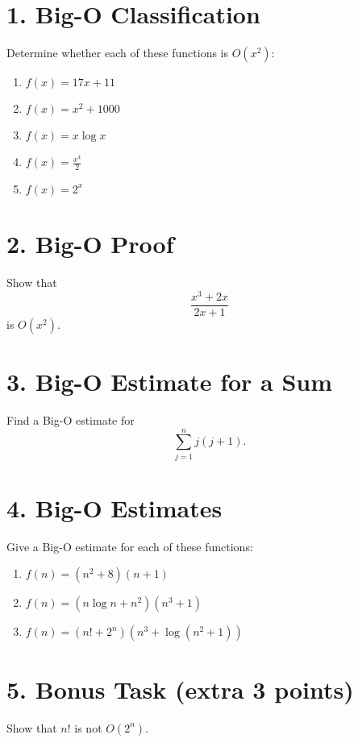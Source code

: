 \documentclass[a4paper,10pt]{article}
\begin{document}
\section*{1. Big-O Classification}

Determine whether each of these functions is \( O(x^2) \):

\begin{enumerate}[label=\arabic*)]
    \item \( f(x) = 17x + 11 \)
    \item \( f(x) = x^2 + 1000 \)
    \item \( f(x) = x \log x \)
    \item \( f(x) = \frac{x^4}{2} \)
    \item \( f(x) = 2^x \)
\end{enumerate}

\newpage

\section*{2. Big-O Proof}

Show that
\[
\frac{x^3 + 2x}{2x + 1}
\]
is \( O(x^2) \).

\newpage

\section*{3. Big-O Estimate for a Sum}

Find a Big-O estimate for
\[
\sum_{j=1}^{n} j(j + 1).
\]

\newpage

\section*{4. Big-O Estimates}

Give a Big-O estimate for each of these functions:

\begin{enumerate}[label=\arabic*)]
    \item \( f(n) = (n^2 + 8)(n + 1) \)
    \item \( f(n) = (n \log n + n^2)(n^3 + 1) \)
    \item \( f(n) = (n! + 2^n)(n^3 + \log(n^2 + 1)) \)
\end{enumerate}

\newpage

\section*{5. Bonus Task (extra 3 points)}

Show that \( n! \) is not \( O(2^n) \).
\end{document}
